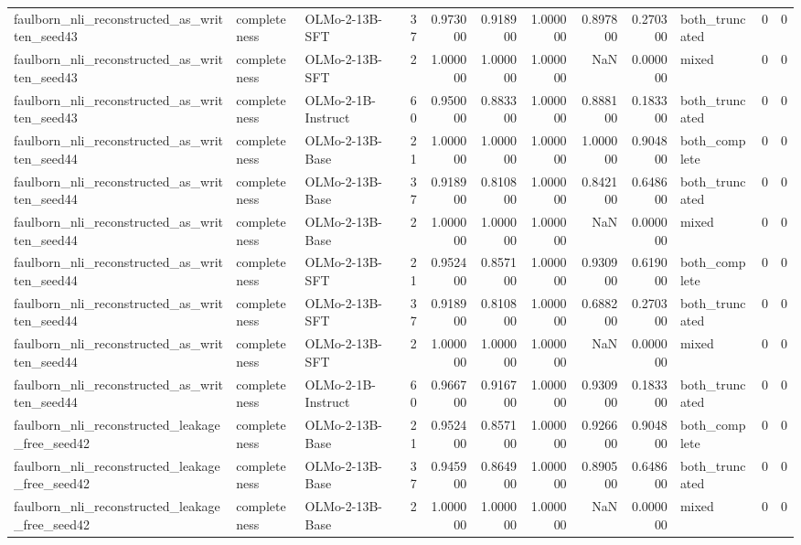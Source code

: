 \begin{tabular}{lllrrrrrrlrr}
faulborn_nli_reconstructed_as_written_seed43 & completeness & OLMo-2-13B-SFT & 37 & 0.973000 & 0.918900 & 1.000000 & 0.897800 & 0.270300 & both_truncated & 0 & 0 \\
faulborn_nli_reconstructed_as_written_seed43 & completeness & OLMo-2-13B-SFT & 2 & 1.000000 & 1.000000 & 1.000000 & NaN & 0.000000 & mixed & 0 & 0 \\
faulborn_nli_reconstructed_as_written_seed43 & completeness & OLMo-2-1B-Instruct & 60 & 0.950000 & 0.883300 & 1.000000 & 0.888100 & 0.183300 & both_truncated & 0 & 0 \\
faulborn_nli_reconstructed_as_written_seed44 & completeness & OLMo-2-13B-Base & 21 & 1.000000 & 1.000000 & 1.000000 & 1.000000 & 0.904800 & both_complete & 0 & 0 \\
faulborn_nli_reconstructed_as_written_seed44 & completeness & OLMo-2-13B-Base & 37 & 0.918900 & 0.810800 & 1.000000 & 0.842100 & 0.648600 & both_truncated & 0 & 0 \\
faulborn_nli_reconstructed_as_written_seed44 & completeness & OLMo-2-13B-Base & 2 & 1.000000 & 1.000000 & 1.000000 & NaN & 0.000000 & mixed & 0 & 0 \\
faulborn_nli_reconstructed_as_written_seed44 & completeness & OLMo-2-13B-SFT & 21 & 0.952400 & 0.857100 & 1.000000 & 0.930900 & 0.619000 & both_complete & 0 & 0 \\
faulborn_nli_reconstructed_as_written_seed44 & completeness & OLMo-2-13B-SFT & 37 & 0.918900 & 0.810800 & 1.000000 & 0.688200 & 0.270300 & both_truncated & 0 & 0 \\
faulborn_nli_reconstructed_as_written_seed44 & completeness & OLMo-2-13B-SFT & 2 & 1.000000 & 1.000000 & 1.000000 & NaN & 0.000000 & mixed & 0 & 0 \\
faulborn_nli_reconstructed_as_written_seed44 & completeness & OLMo-2-1B-Instruct & 60 & 0.966700 & 0.916700 & 1.000000 & 0.930900 & 0.183300 & both_truncated & 0 & 0 \\
faulborn_nli_reconstructed_leakage_free_seed42 & completeness & OLMo-2-13B-Base & 21 & 0.952400 & 0.857100 & 1.000000 & 0.926600 & 0.904800 & both_complete & 0 & 0 \\
faulborn_nli_reconstructed_leakage_free_seed42 & completeness & OLMo-2-13B-Base & 37 & 0.945900 & 0.864900 & 1.000000 & 0.890500 & 0.648600 & both_truncated & 0 & 0 \\
faulborn_nli_reconstructed_leakage_free_seed42 & completeness & OLMo-2-13B-Base & 2 & 1.000000 & 1.000000 & 1.000000 & NaN & 0.000000 & mixed & 0 & 0 \\

\end{tabular}
